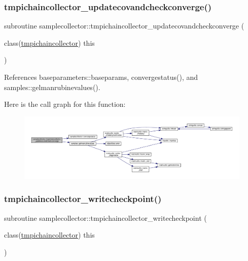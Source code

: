 \subsubsection{\texorpdfstring{tmpichaincollector\+\_\+updatecovandcheckconverge()}{tmpichaincollector\_updatecovandcheckconverge()}}
{\footnotesize\ttfamily subroutine samplecollector\+::tmpichaincollector\+\_\+updatecovandcheckconverge (\begin{DoxyParamCaption}\item[{class(\mbox{\hyperlink{structsamplecollector_1_1tmpichaincollector}{tmpichaincollector}})}]{this }\end{DoxyParamCaption})\hspace{0.3cm}{\ttfamily [private]}}



References baseparameters\+::baseparams, convergestatus(), and samples\+::gelmanrubinevalues().

Here is the call graph for this function\+:
\nopagebreak
\begin{figure}[H]
\begin{center}
\leavevmode
\includegraphics[width=350pt]{namespacesamplecollector_a92e783bc78c7af280b704150840b84cb_cgraph}
\end{center}
\end{figure}
\mbox{\label{namespacesamplecollector_af8bf18826b2f8249278410b12ee73c22}} 
\subsubsection{\texorpdfstring{tmpichaincollector\+\_\+writecheckpoint()}{tmpichaincollector\_writecheckpoint()}}
{\footnotesize\ttfamily subroutine samplecollector\+::tmpichaincollector\+\_\+writecheckpoint (\begin{DoxyParamCaption}\item[{class(\mbox{\hyperlink{structsamplecollector_1_1tmpichaincollector}{tmpichaincollector}})}]{this }\end{DoxyParamCaption})\hspace{0.3cm}{\ttfamily [private]}}




